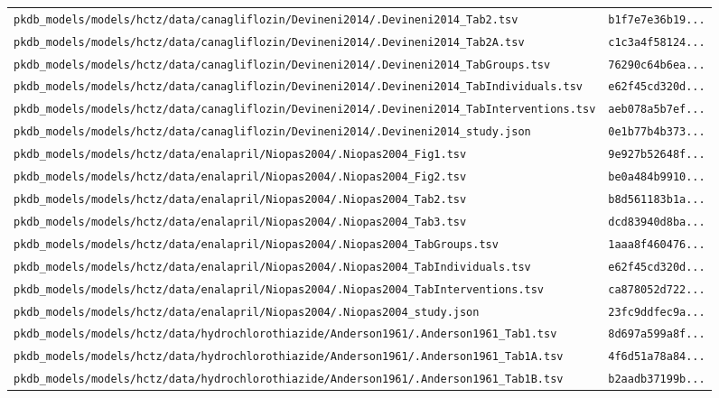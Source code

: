 \documentclass{article}
\begin{document}
\begin{longtable}{ll}
\texttt{pkdb\_models/models/hctz/data/canagliflozin/Devineni2014/.Devineni2014\_Tab2.tsv} & \texttt{b1f7e7e36b19...} \\
\texttt{pkdb\_models/models/hctz/data/canagliflozin/Devineni2014/.Devineni2014\_Tab2A.tsv} & \texttt{c1c3a4f58124...} \\
\texttt{pkdb\_models/models/hctz/data/canagliflozin/Devineni2014/.Devineni2014\_TabGroups.tsv} & \texttt{76290c64b6ea...} \\
\texttt{pkdb\_models/models/hctz/data/canagliflozin/Devineni2014/.Devineni2014\_TabIndividuals.tsv} & \texttt{e62f45cd320d...} \\
\texttt{pkdb\_models/models/hctz/data/canagliflozin/Devineni2014/.Devineni2014\_TabInterventions.tsv} & \texttt{aeb078a5b7ef...} \\
\texttt{pkdb\_models/models/hctz/data/canagliflozin/Devineni2014/.Devineni2014\_study.json} & \texttt{0e1b77b4b373...} \\
\texttt{pkdb\_models/models/hctz/data/enalapril/Niopas2004/.Niopas2004\_Fig1.tsv} & \texttt{9e927b52648f...} \\
\texttt{pkdb\_models/models/hctz/data/enalapril/Niopas2004/.Niopas2004\_Fig2.tsv} & \texttt{be0a484b9910...} \\
\texttt{pkdb\_models/models/hctz/data/enalapril/Niopas2004/.Niopas2004\_Tab2.tsv} & \texttt{b8d561183b1a...} \\
\texttt{pkdb\_models/models/hctz/data/enalapril/Niopas2004/.Niopas2004\_Tab3.tsv} & \texttt{dcd83940d8ba...} \\
\texttt{pkdb\_models/models/hctz/data/enalapril/Niopas2004/.Niopas2004\_TabGroups.tsv} & \texttt{1aaa8f460476...} \\
\texttt{pkdb\_models/models/hctz/data/enalapril/Niopas2004/.Niopas2004\_TabIndividuals.tsv} & \texttt{e62f45cd320d...} \\
\texttt{pkdb\_models/models/hctz/data/enalapril/Niopas2004/.Niopas2004\_TabInterventions.tsv} & \texttt{ca878052d722...} \\
\texttt{pkdb\_models/models/hctz/data/enalapril/Niopas2004/.Niopas2004\_study.json} & \texttt{23fc9ddfec9a...} \\
\texttt{pkdb\_models/models/hctz/data/hydrochlorothiazide/Anderson1961/.Anderson1961\_Tab1.tsv} & \texttt{8d697a599a8f...} \\
\texttt{pkdb\_models/models/hctz/data/hydrochlorothiazide/Anderson1961/.Anderson1961\_Tab1A.tsv} & \texttt{4f6d51a78a84...} \\
\texttt{pkdb\_models/models/hctz/data/hydrochlorothiazide/Anderson1961/.Anderson1961\_Tab1B.tsv} & \texttt{b2aadb37199b...} \\

\end{longtable}
\end{document}
